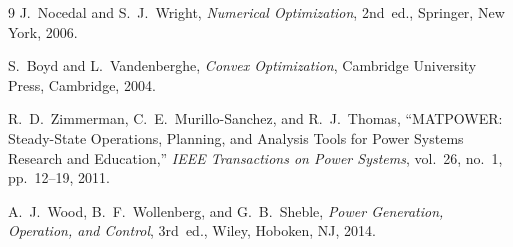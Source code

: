 \documentclass[11pt,a4paper]{article}
\begin{document}
\begin{thebibliography}{9}
J.~Nocedal and S.~J.~Wright,
\textit{Numerical Optimization},
2nd~ed., Springer, New York, 2006.

S.~Boyd and L.~Vandenberghe,
\textit{Convex Optimization},
Cambridge University Press, Cambridge, 2004.

R.~D.~Zimmerman, C.~E.~Murillo-Sanchez, and R.~J.~Thomas,
``MATPOWER: Steady-State Operations, Planning, and Analysis Tools for Power Systems Research and Education,''
\textit{IEEE Transactions on Power Systems}, vol.~26, no.~1, pp.~12--19, 2011.

A.~J.~Wood, B.~F.~Wollenberg, and G.~B.~Sheble,
\textit{Power Generation, Operation, and Control},
3rd~ed., Wiley, Hoboken, NJ, 2014.
\end{thebibliography}
\end{document}
